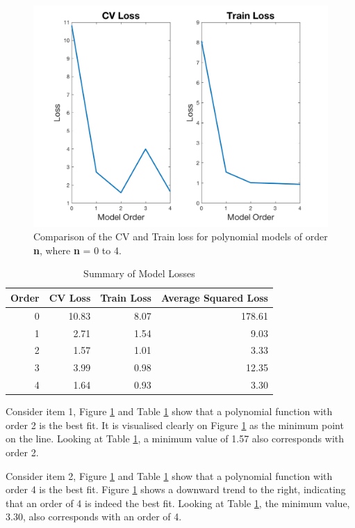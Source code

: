 {\begin{figure}[h]
	\centering
	\includegraphics[width=0.8\linewidth]{images/CVLossANDTrainLoss4}
	\caption{Comparison of the CV and Train loss for polynomial models of order \textbf{n}, where \textbf{n} = 0 to 4.}
	\label{fig:CVT4}
\end{figure}

\begin{table}[h]
	\centering
	\caption{Summary of Model Losses}
	\label{t:ModLoss}
	\begin{tabular}{rrrr}
		\hline
		\textbf{Order} & \textbf{CV Loss} & \textbf{Train Loss} & \textbf{Average Squared Loss} \\ \hline
		0 & 10.83 & 8.07 & 178.61 \\
		1 & 2.71 & 1.54 & 9.03 \\
		2 & 1.57 & 1.01 & 3.33 \\
		3 & 3.99 & 0.98 & 12.35 \\
		4 & 1.64 & 0.93 & 3.30
	\end{tabular}
\end{table}

Consider item 1, Figure \ref{fig:CVT4} and Table \ref{t:ModLoss} show that a polynomial function with order 2 is the best fit. It is visualised clearly on Figure \ref{fig:CVT4} as the minimum point on the line. Looking at Table \ref{t:ModLoss}, a minimum value of 1.57 also corresponds with order 2.

Consider item 2, Figure \ref{fig:CVT4} and Table \ref{t:ModLoss} show that a polynomial function with order 4 is the best fit. Figure \ref{fig:CVT4} shows a downward trend to the right, indicating that an order of 4 is indeed the best fit. Looking at Table \ref{t:ModLoss}, the minimum value, 3.30, also corresponds with an order of 4.

}
